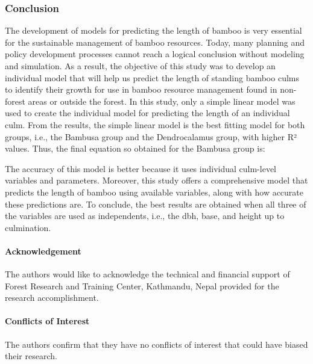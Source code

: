 \documentclass[preprint, 3p,
authoryear]{elsarticle} %
\begin{document}
\hypertarget{conclusion}{%
\subsubsection{Conclusion}\label{conclusion}}

The development of models for predicting the length of bamboo is very
essential for the sustainable management of bamboo resources. Today,
many planning and policy development processes cannot reach a logical
conclusion without modeling and simulation. As a result, the objective
of this study was to develop an individual model that will help us
predict the length of standing bamboo culms to identify their growth for
use in bamboo resource management found in non-forest areas or outside
the forest. In this study, only a simple linear model was used to create
the individual model for predicting the length of an individual culm.
From the results, the simple linear model is the best fitting model for
both groups, i.e., the Bambusa group and the Dendrocalamus group, with
higher R² values. Thus, the final equation so obtained for the Bambusa
group is:

The accuracy of this model is better because it uses individual
culm-level variables and parameters. Moreover, this study offers a
comprehensive model that predicts the length of bamboo using available
variables, along with how accurate these predictions are. To conclude,
the best results are obtained when all three of the variables are used
as independents, i.e., the dbh, base, and height up to culmination.

\hypertarget{acknowledgement}{%
\paragraph{Acknowledgement}\label{acknowledgement}}

The authors would like to acknowledge the technical and financial
support of Forest Research and Training Center, Kathmandu, Nepal
provided for the research accomplishment.

\hypertarget{conflicts-of-interest}{%
\paragraph{Conflicts of Interest}\label{conflicts-of-interest}}

The authors confirm that they have no conflicts of interest that could
have biased their research.


\end{document}

